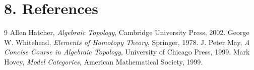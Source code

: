 \section*{8. References}

\begin{thebibliography}{9}
 Allen Hatcher, \emph{Algebraic Topology}, Cambridge University Press, 2002.
 George W. Whitehead, \emph{Elements of Homotopy Theory}, Springer, 1978.
 J. Peter May, \emph{A Concise Course in Algebraic Topology}, University of Chicago Press, 1999.
 Mark Hovey, \emph{Model Categories}, American Mathematical Society, 1999.
\end{thebibliography}
